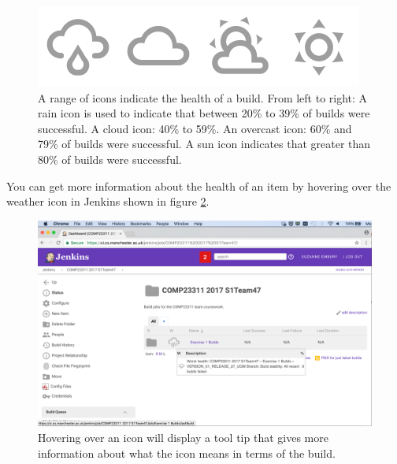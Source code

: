 \documentclass[
]{book}
\begin{document}
\begin{figure}

{\centering \includegraphics[width=1\linewidth]{images/weather-montage} 

}

\caption{A range of icons indicate the health of a build. From left to right: A rain icon is used to indicate that between 20\% to 39\% of builds were successful. A cloud icon: 40\% to 59\%. An overcast icon: 60\% and 79\% of builds were successful. A sun icon indicates that greater than 80\% of builds were successful.}\label{fig:weather-montage-fig}
\end{figure}



You can get more information about the health of an item by hovering over the weather icon in Jenkins shown in figure \ref{fig:toolTipWeatherExercise1-fig}.

\begin{figure}

{\centering \includegraphics[width=1\linewidth]{images/toolTipWeatherExercise1} 

}

\caption{Hovering over an icon will display a tool tip that gives more information about what the icon means in terms of the build.}\label{fig:toolTipWeatherExercise1-fig}
\end{figure}
\end{document}
